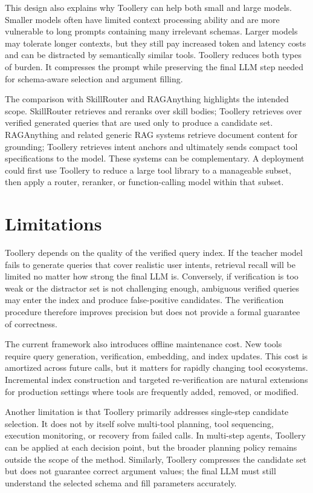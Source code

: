 \documentclass[11pt]{article}
\begin{document}
This design also explains why Toollery can help both small and large models. Smaller models often have limited context processing ability and are more vulnerable to long prompts containing many irrelevant schemas. Larger models may tolerate longer contexts, but they still pay increased token and latency costs and can be distracted by semantically similar tools. Toollery reduces both types of burden. It compresses the prompt while preserving the final LLM step needed for schema-aware selection and argument filling.

The comparison with SkillRouter and RAGAnything highlights the intended scope. SkillRouter retrieves and reranks over skill bodies; Toollery retrieves over verified generated queries that are used only to produce a candidate set. RAGAnything and related generic RAG systems retrieve document content for grounding; Toollery retrieves intent anchors and ultimately sends compact tool specifications to the model. These systems can be complementary. A deployment could first use Toollery to reduce a large tool library to a manageable subset, then apply a router, reranker, or function-calling model within that subset.

\section{Limitations}
\label{sec:limitations_draft}

Toollery depends on the quality of the verified query index. If the teacher model fails to generate queries that cover realistic user intents, retrieval recall will be limited no matter how strong the final LLM is. Conversely, if verification is too weak or the distractor set is not challenging enough, ambiguous verified queries may enter the index and produce false-positive candidates. The verification procedure therefore improves precision but does not provide a formal guarantee of correctness.

The current framework also introduces offline maintenance cost. New tools require query generation, verification, embedding, and index updates. This cost is amortized across future calls, but it matters for rapidly changing tool ecosystems. Incremental index construction and targeted re-verification are natural extensions for production settings where tools are frequently added, removed, or modified.

Another limitation is that Toollery primarily addresses single-step candidate selection. It does not by itself solve multi-tool planning, tool sequencing, execution monitoring, or recovery from failed calls. In multi-step agents, Toollery can be applied at each decision point, but the broader planning policy remains outside the scope of the method. Similarly, Toollery compresses the candidate set but does not guarantee correct argument values; the final LLM must still understand the selected schema and fill parameters accurately.
\end{document}
